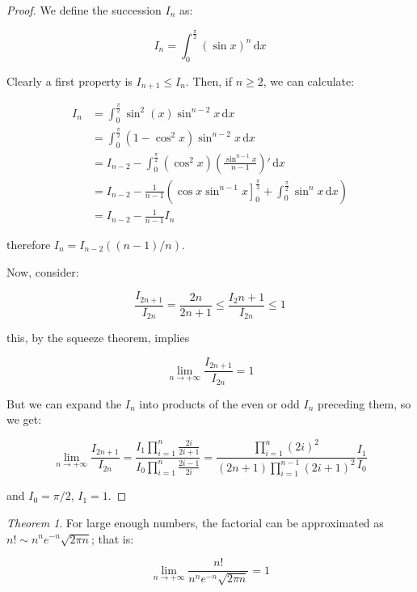 \documentclass[12pt,a4paper]{report}
\numberwithin{equation}{section}
\theoremstyle{definition}
\theoremstyle{remark}
\newtheorem{theorem}{Theorem}[section]
\begin{document}
\begin{proof}
We define the succession $I_n$ as:

\begin{equation}
I_n = \int^{\frac{\pi}{2}}_{0} (\sin x )^n \, \text{d}x
\end{equation}

Clearly a first property is $I_{n+1} \leq I_n$. Then, if $n\geq 2$, we can calculate:

\begin{align*}
I_n &= \int^{\frac{\pi}{2}}_{0} \sin^2 (x) \sin^{n-2} x \, \text{d}x\\
&= \int^{\frac{\pi}{2}}_{0} (1-\cos^2 x) \sin^{n-2} x \, \text{d}x\\
&= I_{n-2} -\int^{\frac{\pi}{2}}_{0} (\cos^2 x) \left( \frac{\sin^{n-1} x}{n-1} \right)' \, \text{d}x\\
&= I_{n-2} -\frac{1}{n-1} \left(\left. \cos x \sin^{n-1} x \right]^{\frac{\pi}{2}}_0 + \int^{\frac{\pi}{2}}_{0} \sin^n x \, \text{d}x \right)\\
&= I_{n-2} - \frac{1}{n-1} I_n
\end{align*}

therefore $I_n = I_{n-2} ((n-1)/n)$.

Now, consider:

\begin{equation}
\frac{I_{2n+1}}{I_{2n}} = \frac{2n}{2n+1}\leq \frac{I_2n+1}{I_{2n}} \leq 1
\end{equation}

this, by the squeeze theorem, implies

\begin{equation}
\lim_{n\rightarrow +\infty} \frac{I_{2n+1}}{I_{2n}} =1
\end{equation}

But we can expand the $I_n$ into products of the even or odd $I_n$ preceding them, so we get:

\begin{equation}
\lim_{n\rightarrow+\infty} \frac{I_{2n+1}}{I_{2n}} = \frac{I_1 \displaystyle\prod_{i=1}^{n} \frac{2i}{2i+1}}{I_0 \displaystyle \prod _{i=1}^{n} \frac{2i-1}{2i}} = \frac{\displaystyle\prod_{i=1}^{n} (2i)^2}{(2n+1)\displaystyle \prod _{i=1}^{n-1} (2i+1)^2} \frac{I_1}{I_0}
\end{equation}

and $I_0 = \pi /2$, $I_1 = 1$.
\end{proof}


\begin{theorem}
For large enough numbers, the factorial can be approximated as $n! \sim n^n e^{-n} \sqrt{2\pi n}$; that is:

\begin{equation}
\lim_{n\rightarrow +\infty} \frac{n!}{n^n e^{-n} \sqrt{2\pi n}} = 1
\end{equation}
\end{theorem}
\end{document}
